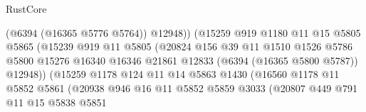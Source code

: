 \begin{lexlean}{RustCore}
\begin{coremodule}
                                        (@6394 (@16365 @5776 @5764))
                                        @12948))
                                    (@15259
                                      @919
                                      @1180
                                      @11
                                      @15
                                      @5805
                                      @5865
                                      (@15239
                                        @919
                                        @11
                                        @5805
                                        (@20824
                                          @156
                                          @39
                                          @11
                                          @1510
                                          @1526
                                          @5786
                                          @5800
                                          @15276
                                          @16340
                                          @16346
                                          @21861
                                          @12833
                                          (@6394 (@16365 @5800 @5787))
                                          @12948))
                                      (@15259
                                        @1178
                                        @124
                                        @11
                                        @14
                                        @5863
                                        @1430
                                        (@16560
                                          @1178
                                          @11
                                          @5852
                                          @5861
                                          (@20938
                                            @946
                                            @16
                                            @11
                                            @5852
                                            @5859
                                            @3033
                                            (@20807
                                              @449
                                              @791
                                              @11
                                              @15
                                              @5838
                                              @5851

\end{coremodule}
\end{lexlean}
